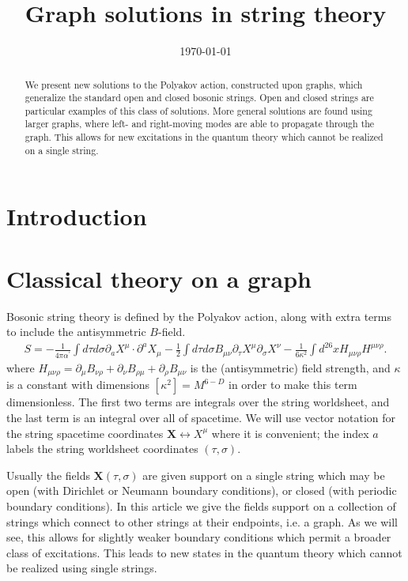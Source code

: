\documentclass{revtex4}
\newcommand{\be}{\begin{eqnarray}}
\newcommand{\ee}{\end{eqnarray}}
\def\X{\bm{X}}
\begin{document}
\title{Graph solutions in string theory}
\date{\today}

\begin{abstract}
We present new solutions to the Polyakov action, constructed upon graphs, which generalize the standard open and closed bosonic strings. Open and closed strings are particular examples of this class of solutions. More general solutions are found using larger graphs, where left- and right-moving modes are able to propagate through the graph. This allows for new excitations in the quantum theory which cannot be realized on a single string.
\end{abstract}

\maketitle

\section{Introduction}

\section{Classical theory on a graph}
Bosonic string theory is defined by the Polyakov action, along with extra terms to include the antisymmetric $B$-field.
\be
S = - \frac{1}{4 \pi \alpha^\prime} \int d\tau d\sigma \partial_a X^\mu \cdot \partial^a X_\mu 
- \frac{1}{2} \int d\tau d\sigma B_{\mu \nu} \partial_\tau X^\mu \partial_\sigma X^\nu
- \frac{1}{6 \kappa^2} \int d^{26} x H_{\mu \nu \rho} H^{\mu \nu \rho} .
\ee
where $H_{\mu \nu \rho} = \partial_\mu B_{\nu \rho} +  \partial_\nu B_{\rho \mu}+ \partial_\rho B_{\mu \nu}$ is the (antisymmetric) field strength, and $\kappa$ is a constant with dimensions $[\kappa^2] = M^{6-D}$ in order to make this term dimensionless. The first two terms are integrals over the string worldsheet, and the last term is an integral over all of spacetime.
We will use vector notation for the string spacetime coordinates $\X \leftrightarrow X^\mu$ where it is convenient; the index $a$ labels the string worldsheet coordinates $(\tau, \sigma)$.

Usually the fields $\X(\tau, \sigma)$ are given support on a single string which may be open (with Dirichlet or Neumann boundary conditions), or closed (with periodic boundary conditions). In this article we give the fields support on a collection of strings which connect to other strings at their endpoints, i.e. a graph. As we will see, this allows for slightly weaker boundary conditions which permit a broader class of excitations. This leads to new states in the quantum theory which cannot be realized using single strings.
\end{document}
